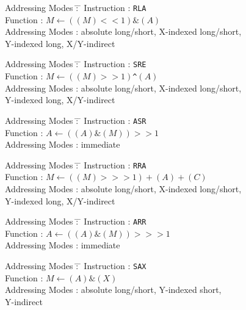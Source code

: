 \documentclass[12pt,twoside]{report}
\newcommand{\tty}[1]{{\tt #1}}
\begin{document}
\begin{tabbing}
Addressing Modes \= : \= \kill 
Instruction      \> : \> \tty{RLA} \\
Function         \> : \> $M\leftarrow((M)<<1)\&(A)$ \\
Addressing Modes \> : \> absolute long/short, X-indexed long/short, \\
                 \>   \> Y-indexed long, X/Y-indirect \\
\end{tabbing}

\begin{tabbing}
Addressing Modes \= : \= \kill 
Instruction      \> : \> \tty{SRE} \\
Function         \> : \> $M\leftarrow((M)>>1)$\verb!^!$(A)$ \\
Addressing Modes \> : \> absolute long/short, X-indexed long/short, \\
                 \>   \> Y-indexed long, X/Y-indirect \\
\end{tabbing}

\begin{tabbing}
Addressing Modes \= : \= \kill 
Instruction      \> : \> \tty{ASR} \\
Function         \> : \> $A\leftarrow((A)\&(M))>>1$ \\
Addressing Modes \> : \> immediate \\
\end{tabbing}

\begin{tabbing}
Addressing Modes \= : \= \kill 
Instruction      \> : \> \tty{RRA} \\
Function         \> : \> $M\leftarrow((M)>>>1)+(A)+(C)$ \\
Addressing Modes \> : \> absolute long/short, X-indexed long/short, \\
                 \>   \> Y-indexed long, X/Y-indirect \\
\end{tabbing}

\begin{tabbing}
Addressing Modes \= : \= \kill 
Instruction      \> : \> \tty{ARR} \\
Function         \> : \> $A\leftarrow((A)\&(M))>>>1$ \\
Addressing Modes \> : \> immediate \\
\end{tabbing}

\begin{tabbing}
Addressing Modes \= : \= \kill 
Instruction      \> : \> \tty{SAX} \\
Function         \> : \> $M\leftarrow(A)\&(X)$ \\
Addressing Modes \> : \> absolute long/short, Y-indexed short, \\
                 \>   \> Y-indirect \\
\end{tabbing}
\end{document}
